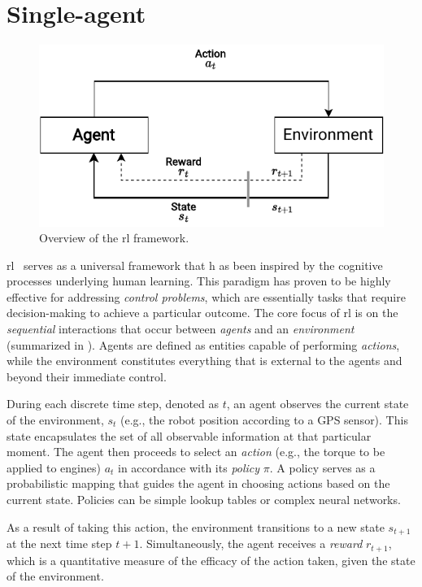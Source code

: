 \section{Single-agent}\label{chap:rl:single}
\begin{figure}
  \includegraphics[width=\textwidth]{chapters/img/single-agent-rl.drawio.pdf}
  \caption{Overview of the \ac{rl} framework.}\label{fig:rl:overview}
\end{figure}
\Acl{rl}~\cite{sutton2018reinforcement-learning} serves as a universal framework that h
 as been inspired by the cognitive processes underlying human learning. 
 This paradigm has proven to be highly effective for addressing \emph{control problems}, 
 which are essentially tasks that require decision-making to achieve a particular outcome.
%
The core focus of \ac{rl} is on the \emph{sequential} interactions that occur between \emph{agents} 
 and an \emph{environment} (summarized in ). 
 Agents are defined as entities capable of performing \emph{actions}, 
 while the environment constitutes everything that is external to the agents 
 and beyond their immediate control.

During each discrete time step, 
 denoted as $t$, an agent observes the current state of the environment, 
 $s_t$ (e.g., the robot position according to a GPS sensor). 
This state encapsulates the set of all observable information at that particular moment. 
The agent then proceeds to select an \emph{action} 
 (e.g., the torque to be applied to engines) 
 $a_t$ in accordance with its \emph{policy} $\pi$. 
A policy serves as a probabilistic mapping that guides the agent in choosing actions 
 based on the current state. 
 Policies can be simple lookup tables or complex neural networks.

As a result of taking this action, 
 the environment transitions to a new state $s_{t+1}$ at the next time step $t+1$. 
 Simultaneously, the agent receives a \emph{reward} $r_{t+1}$, 
 which is a quantitative measure of the efficacy of the action taken, 
 given the state of the environment.

